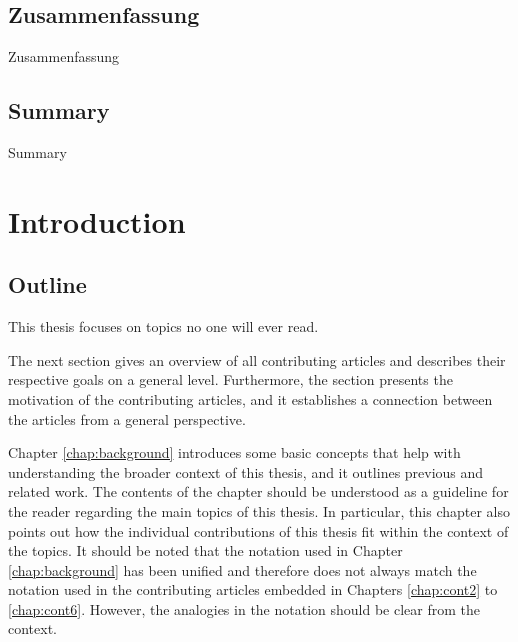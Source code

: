 \documentclass[bibliography=totoc,11pt,BCOR=12mm,DIV=14,twoside,parskip=half,paper=A4,pagesize=auto]{scrbook}\usepackage[]{graphicx}\usepackage{xcolor}
\begin{document}
\thispagestyle{empty}
\section*{Zusammenfassung}

Zusammenfassung

\cleardoublepage




\thispagestyle{empty}
\section*{Summary}

Summary

\cleardoublepage

{\small \tableofcontents}
\cleardoublepage

\mainmatter\setcounter{page}{1}



\chapter{Introduction}

\section{Outline}
This thesis focuses on topics no one will ever read.

The next section gives an overview of all contributing articles and describes their respective goals on a general level.
Furthermore, the section presents the motivation of the contributing articles, and it establishes a connection between the articles from a general perspective.

Chapter \ref{chap:background} introduces some basic concepts that help with understanding the broader context of this thesis, and it outlines previous and related work.
The contents of the chapter should be understood as a guideline for the reader regarding the main topics of this thesis.
In particular, this chapter also points out how the individual contributions of this thesis fit within the context of the topics.
It should be noted that the notation used in Chapter \ref{chap:background} has been unified and therefore does not always match the notation used in the contributing articles embedded in Chapters \ref{chap:cont2} to \ref{chap:cont6}.
However, the analogies in the notation should be clear from the context.
\end{document}
